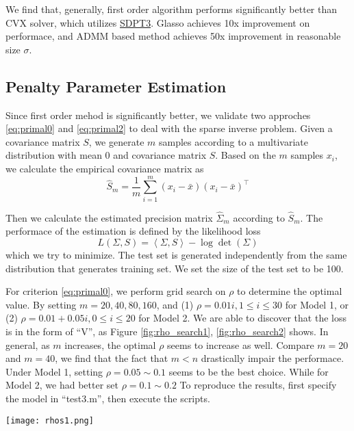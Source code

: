 \documentclass[conference,onecolumn,12pt]{IEEEtran}
\newcommand{\<}{\langle}
\renewcommand{\>}{\rangle}
\numberwithin{equation}{section}
\begin{document}
We find that, generally, first order algorithm performs significantly better than CVX solver, which utilizes \href{http://www.math.cmu.edu/~reha/sdpt3.html}{SDPT3}\cite{toh1999sdpt3}. Glasso achieves 10x improvement on performace, and ADMM based method achieves 50x improvement in reasonable size $\sigma$. 

\subsection{Penalty Parameter Estimation}
\label{sec:penal}
Since first order mehod is significantly better, we validate two approches \ref{eq:primal0} and \ref{eq:primal2} to deal with the sparse inverse problem. Given a covariance matrix $S$, we generate $m$ samples according to a multivariate distribution with mean 0 and covariance matrix $S$. Based on the $m$ samples $x_i$, we calculate the empirical covariance matrix as
\begin{equation}
    \widehat{S}_m = \frac{1}{m}\sum_{i=1}^m (x_i-\bar{x})(x_i-\bar{x})^\top
\end{equation}

Then we calculate the estimated precision matrix $\widehat{\Sigma}_m$ according to $\widehat{S}_m$. The performace of the estimation is defined by the likelihood loss
\begin{equation}
    L(\Sigma,S)=\left<\Sigma,S\right>-\log\det(\Sigma)
\end{equation}
which we try to minimize. The test set is generated independently from the same distribution that generates training set. We set the size of the test set to be 100.

For criterion \ref{eq:primal0}, we perform grid search on $\rho$ to determine the optimal value. By setting $m=20,40,80,160$, and (1) $\rho=0.01i,1\leq i\leq 30$ for Model 1,  or (2) $\rho=0.01+0.05i,0\leq i\leq 20$ for Model 2. We are able to discover that the loss is in the form of ``V'', as Figure \ref{fig:rho_search1}, \ref{fig:rho_search2} shows. In general, as $m$ increases, the optimal $\rho$ seems to increase as well. Compare $m=20$ and $m=40$, we find that the fact that $m<n$ drastically impair the performace. Under Model 1, setting $\rho=0.05\sim 0.1$ seems to be the best choice. While for Model 2, we had better set $\rho=0.1\sim 0.2$ To reproduce the results, first specify the model in ``test3.m'', then execute the scripts.

\clearpage
\begin{figure*}
    \centering
    \texttt{[image: rhos1.png]}
    \caption{Search for $\rho$ in range $[0.01,1]$ based on Model 1}
    \label{fig:rho_search1}
\end{figure*}
\end{document}
